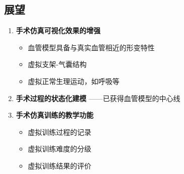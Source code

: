 \subsection{展望}
\begin{frame}
\begin{enumerate}
\item \textbf{手术仿真可视化效果的增强}
\begin{itemize}
\item 血管模型具备与真实血管相近的形变特性
\item 虚拟支架-气囊结构
\item 虚拟正常生理运动，如呼吸等
\end{itemize}
\pause \item \textbf{手术过程的状态化建模} \pause ——已获得血管模型的中心线
\pause \item \textbf{手术仿真训练的教学功能}
\begin{itemize}
\item 虚拟训练过程的记录
\item 虚拟训练难度的分级
\item 虚拟训练结果的评价
\end{itemize}
\end{enumerate}
\end{frame}





